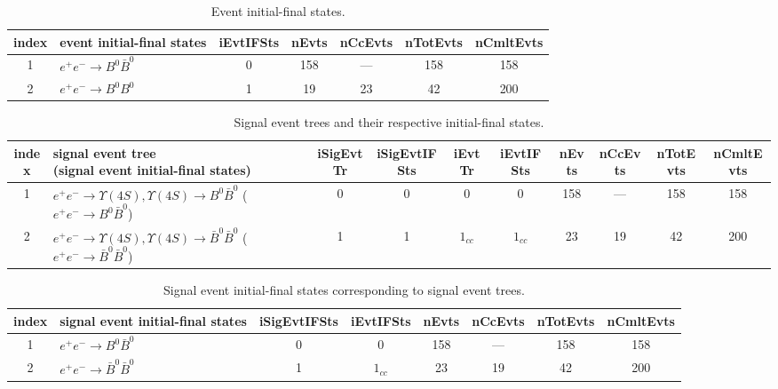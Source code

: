 \documentclass[landscape]{article}
\begin{document}
\clearpage

\begin{table}[htbp!]
\caption{Event initial-final states.}
\small
\centering
\begin{tabular}{|c|>{\centering}p{13.5cm}|c|c|c|c|c|}
\hline
index & event initial-final states & iEvtIFSts & nEvts & nCcEvts & nTotEvts & nCmltEvts \\
\hline
1 & $ e^{+} e^{-} \rightarrow B^{0} \bar{B}^{0} $ & 0 & 158 & --- & 158 & 158 \\
\hline
2 & $ e^{+} e^{-} \rightarrow B^{0} B^{0} $ & 1 & 19 & 23 & 42 & 200 \\
\hline
\end{tabular}
\end{table}

\clearpage

\begin{table}[htbp!]
\caption{Signal event trees and their respective initial-final states.}
\small
\centering
\begin{tabular}{|c|>{\centering}p{10.5cm}|c|c|c|c|c|c|c|c|}
\hline
index & \thead{signal event tree \\ (signal event initial-final states)} & iSigEvtTr & iSigEvtIFSts & iEvtTr & iEvtIFSts & nEvts & nCcEvts & nTotEvts & nCmltEvts \\
\hline
1 & \makecell{ $ 
e^{+} e^{-} \rightarrow \Upsilon(4S) ,
\Upsilon(4S) \rightarrow B^{0} \bar{B}^{0} 
$ \\ ($
e^{+} e^{-} \rightarrow B^{0} \bar{B}^{0} 
$) } & 0 & 0 & 0 & 0 & 158 & --- & 158 & 158 \\
\hline
2 & \makecell{ $ 
e^{+} e^{-} \rightarrow \Upsilon(4S) ,
\Upsilon(4S) \rightarrow \bar{B}^{0} \bar{B}^{0} 
$ \\ ($
e^{+} e^{-} \rightarrow \bar{B}^{0} \bar{B}^{0} 
$) } & 1 & 1 & $ 1_{cc} $ & $ 1_{cc} $ & 23 & 19 & 42 & 200 \\
\hline
\end{tabular}
\end{table}

\clearpage

\begin{table}[htbp!]
\caption{Signal event initial-final states corresponding to signal event trees.}
\small
\centering
\begin{tabular}{|c|>{\centering}p{12cm}|c|c|c|c|c|c|}
\hline
index & signal event initial-final states & iSigEvtIFSts & iEvtIFSts & nEvts & nCcEvts & nTotEvts & nCmltEvts \\
\hline
1 & $ e^{+} e^{-} \rightarrow B^{0} \bar{B}^{0} $ & 0 & 0 & 158 & --- & 158 & 158 \\
\hline
2 & $ e^{+} e^{-} \rightarrow \bar{B}^{0} \bar{B}^{0} $ & 1 & $ 1_{cc} $ & 23 & 19 & 42 & 200 \\
\hline
\end{tabular}
\end{table}
\end{document}
